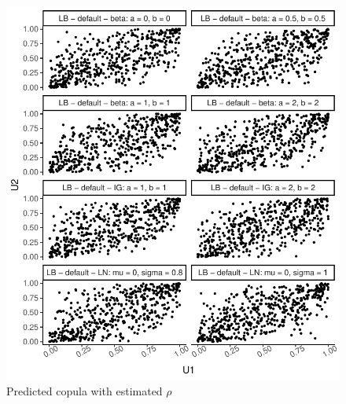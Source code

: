 \documentclass{amsart}
\begin{document}
\begin{figure}[ht]
	\centering
	\includegraphics[width=0.95\linewidth]{simulated_copula_5.pdf}
	\caption{Predicted copula with estimated $\rho$}
	\label{fig:sim:copula:5}
\end{figure}
\end{document}
